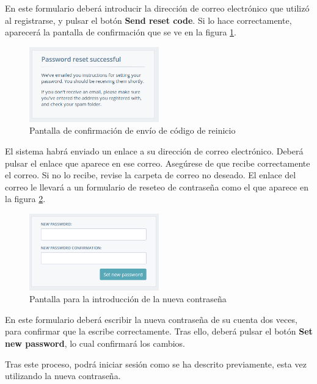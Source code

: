 En este formulario deberá introducir la dirección de correo electrónico que
utilizó al registrarse, y pulsar el botón \textbf{Send reset code}. Si lo hace
correctamente, aparecerá la pantalla de confirmación que se ve en la figura
\ref{fig:pantalla-reset-enviado}.

\begin{figure}[hbtp]
  \centering
  \includegraphics[width=0.5\textwidth]{apendice_manual_usuario/pantalla_reset_enviado.png}
  \caption{Pantalla de confirmación de envío de código de reinicio}
  \label{fig:pantalla-reset-enviado}
\end{figure}

El sistema habrá enviado un enlace a su dirección de correo electrónico. Deberá
pulsar el enlace que aparece en ese correo. Asegúrese de que recibe
correctamente el correo. Si no lo recibe, revise la carpeta de correo no
deseado. El enlace del correo le llevará a un formulario de reseteo de
contraseña como el que aparece en la figura \ref{fig:formulario-reset-2}.

\begin{figure}[hbtp]
  \centering
  \includegraphics[width=0.5\textwidth]{apendice_manual_usuario/general_formulario_reset_2.png}
  \caption{Pantalla para la introducción de la nueva contraseña}
  \label{fig:formulario-reset-2}
\end{figure}

En este formulario deberá escribir la nueva contraseña de su cuenta dos veces,
para confirmar que la escribe correctamente. Tras ello, deberá pulsar el botón
\textbf{Set new password}, lo cual confirmará los cambios. 

Tras este proceso, podrá iniciar sesión como se ha descrito previamente, esta
vez utilizando la nueva contraseña.


